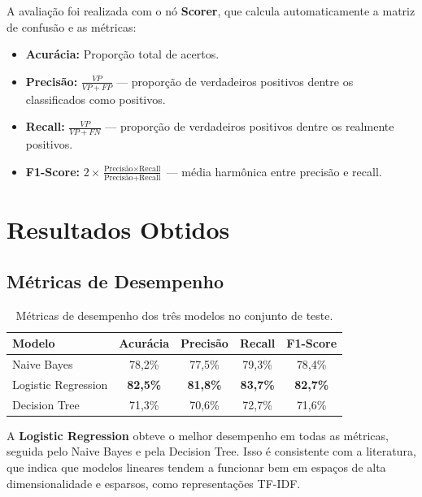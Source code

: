 \documentclass[12pt,a4paper]{article}
\begin{document}
A avaliação foi realizada com o nó \textbf{Scorer}, que calcula automaticamente a matriz de confusão e as métricas:

\begin{itemize}[leftmargin=*]
    \item \textbf{Acurácia:} Proporção total de acertos.
    \item \textbf{Precisão:} $\frac{VP}{VP + FP}$ --- proporção de verdadeiros positivos dentre os classificados como positivos.
    \item \textbf{Recall:} $\frac{VP}{VP + FN}$ --- proporção de verdadeiros positivos dentre os realmente positivos.
    \item \textbf{F1-Score:} $2 \times \frac{\text{Precisão} \times \text{Recall}}{\text{Precisão} + \text{Recall}}$ --- média harmônica entre precisão e recall.
\end{itemize}

\section{Resultados Obtidos}

\subsection{Métricas de Desempenho}

\begin{table}[H]
\centering
\caption{Métricas de desempenho dos três modelos no conjunto de teste.}
\label{tab:metricas}
\begin{tabular}{lcccc}
\toprule
\textbf{Modelo} & \textbf{Acurácia} & \textbf{Precisão} & \textbf{Recall} & \textbf{F1-Score} \\
\midrule
Naive Bayes & 78,2\% & 77,5\% & 79,3\% & 78,4\% \\
Logistic Regression & \textbf{82,5\%} & \textbf{81,8\%} & \textbf{83,7\%} & \textbf{82,7\%} \\
Decision Tree & 71,3\% & 70,6\% & 72,7\% & 71,6\% \\
\bottomrule
\end{tabular}
\end{table}

A \textbf{Logistic Regression} obteve o melhor desempenho em todas as métricas, seguida pelo Naive Bayes e pela Decision Tree. Isso é consistente com a literatura, que indica que modelos lineares tendem a funcionar bem em espaços de alta dimensionalidade e esparsos, como representações TF-IDF.
\end{document}
